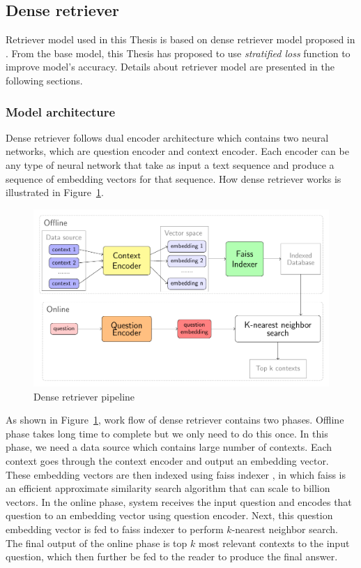 \documentclass[12pt, sort&compress]{report}
\begin{document}
\subsection{Dense retriever}
\label{sec:3.2.1}
Retriever model used in this Thesis is based on dense retriever model proposed in \cite{karpukhin2020dense}. From the base model, this Thesis has proposed to use \textit{stratified loss} function to improve model's accuracy. Details about retriever model are presented in the following sections.
\subsubsection{Model architecture}
\label{sec:3.2.1.1}
Dense retriever follows dual encoder architecture which contains two neural networks, which are question encoder and context encoder. Each encoder can be any type of neural network that take as input a text sequence and produce a sequence of embedding vectors for that sequence. How dense retriever works is illustrated in Figure~\ref{fig:04}.
\begin{figure}[!htbp]
	\centering
	\includegraphics[scale=.8]{images/PDF/biencoder/biencoder.pdf}
	\caption{Dense retriever pipeline}
	\label{fig:04}
\end{figure}
\par As shown in Figure~\ref{fig:04}, work flow of dense retriever contains two phases. Offline phase takes long time to complete but we only need to do this once. In this phase, we need a data source which contains large number of contexts. Each context goes through the context encoder and output an embedding vector. These embedding vectors are then indexed using faiss indexer \cite{JDH17}, in which faiss is an efficient approximate similarity search algorithm that can scale to billion vectors. In the online phase, system receives the input question and encodes that question to an embedding vector using question encoder. Next, this question embedding vector is fed to faiss indexer to perform $k$-nearest neighbor search. The final output of the online phase is top $k$ most relevant contexts to the input question, which then further be fed to the reader to produce the final answer.
\end{document}
